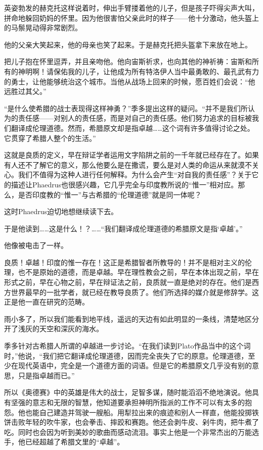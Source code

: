 \documentclass[UTF8]{article}
\begin{document}
\par 英姿勃发的赫克托这样说着时，伸出手臂搂着他的儿子，但是孩子吓得尖声大叫，拼命地躲回奶妈的怀里。因为他很害怕父亲此时的样子——他十分激动，他头盔上的马鬃晃动得非常剧烈。
\par 他的父亲大笑起来，他的母亲也笑了起来。于是赫克托把头盔拿下来放在地上。
\par 把儿子抱在怀里逗弄，并且亲吻他。他向宙斯祈求，也向其他的神祈祷：宙斯和所有的神明啊！请保佑我的儿子，让他成为所有特洛伊人当中最勇敢的、最孔武有力的勇士，让他能够统治这个城市。当他从战场上回来的时候，愿百姓们会说：“他远胜过其父。”
\par “是什么使希腊的战士表现得这样神勇？”季多提出这样的疑问。“并不是我们所认为的责任感——对别人的责任感，而是对自己的责任感。他们努力追求的目标被我们翻译成伦理道德。然而，希腊原文却是指卓越……这个词有许多值得讨论之处。它贯穿了希腊人整个的生活。”
\par 这就是良质的定义，早在辩证学者运用文字陷阱之前的一千年就已经存在了。如果有人还不了解它的意义，那么他要么是在撒谎，要么是对人类的命运从来就漠不关心。我们不值得为这种人进行任何解释。为什么会产生“对自我的责任感”？关于它的描述让Phaedrus也很感兴趣，它几乎完全与印度教所说的“惟一”相对应。那么，是否印度教的“惟一”与古希腊的“伦理道德”就是同一体呢？
\par 这时Phaedrus迫切地想继续读下去。
\par 于是他读到……这是什么！？……“我们翻译成伦理道德的希腊原文是指‘卓越’。”
\par 他像被电击了一样。
\par 良质！卓越！印度的惟一存在！这正是希腊智者所教导的！并不是相对主义的伦理，也不是原始的道德，而是卓越。早在理性教会之前，早在本体出现之前，早在形式之前，早在心物之前，早在辩证法之前，良质就一直是绝对的存在。他们是西方世界最早的一批学者，就已经在教导良质了。他们所选择的媒介就是修辞学。这正是他一直在研究的范畴。
\par 雨小多了，所以我们能看到地平线，遥远的天边有如此明显的一条线，清楚地区分开了浅灰的天空和深灰的海水。
\par 季多针对古希腊人所谓的卓越进一步讨论。“在我们读到Plato作品当中的这个词时，”他说，“我们把它翻译成伦理道德，因而完全丧失了它的原意。伦理道德，至少在现代英语中，完全是一个道德方面的词语。但是它的希腊原文几乎没有别的意思，只是指卓越而已。”
\par 所以《奥德赛》中的英雄是伟大的战士，足智多谋，随时能滔滔不绝地演说。他具有坚强的意志和无限的智慧，他知道要承担神明所指派的工作不可以有太多的抱怨。他也能自己建造并驾驶一艘船。用犁拉出来的痕迹和别人一样直，他能投掷铁饼击败年轻的吹牛家，也会拳击、摔跤和赛跑。他还会剥牛皮、剁牛肉，把牛煮了吃。同时也会因为听到美妙的歌曲而感动流泪。事实上他是一个非常杰出的万能选手，他已经超越了希腊文里的“卓越”。
\end{document}
